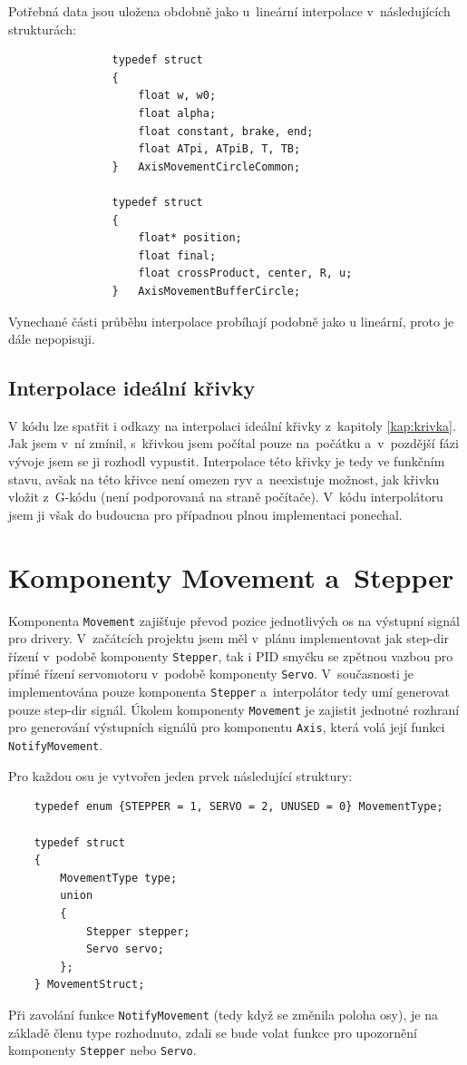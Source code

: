 		Potřebná data jsou uložena obdobně jako u~lineární interpolace v~následujících strukturách:
				\begin{verbatim}
				typedef struct
				{
				    float w, w0;
				    float alpha;
				    float constant, brake, end;
				    float ATpi, ATpiB, T, TB;
				}	AxisMovementCircleCommon;
				
				typedef struct
				{
				    float* position;
				    float final;
				    float crossProduct, center, R, u;
				}	AxisMovementBufferCircle;
				\end{verbatim}
		
		Vynechané části průběhu interpolace probíhají podobně jako u lineární, proto je dále nepopisuji.
		
		\subsection{Interpolace ideální křivky}
		V kódu lze spatřit i odkazy na interpolaci ideální křivky z~kapitoly \ref{kap:krivka}. Jak jsem v~ní zmínil, s~křivkou jsem počítal pouze na~počátku a~v~pozdější fázi vývoje jsem se ji rozhodl vypustit. Interpolace této křivky je tedy ve funkčním stavu, avšak na této křivce není omezen ryv a~neexistuje možnost, jak křivku vložit z~G-kódu (není podporovaná na straně počítače). V~kódu interpolátoru jsem ji však do budoucna pro případnou plnou implementaci ponechal.
		
	\section{Komponenty Movement a~Stepper}
	
	Komponenta {\tt Movement} zajišťuje převod pozice jednotlivých os na výstupní signál pro drivery. V~začátcích projektu jsem měl v~plánu implementovat jak step-dir řízení v~podobě komponenty {\tt Stepper}, tak i PID smyčku se zpětnou vazbou pro přímé řízení servomotoru v~podobě komponenty {\tt Servo}. V~současnosti je implementována pouze komponenta {\tt Stepper} a~interpolátor tedy umí generovat pouze step-dir signál. Úkolem komponenty {\tt Movement} je zajistit jednotné rozhraní pro generování výstupních signálů pro komponentu {\tt Axis}, která volá její funkci {\tt NotifyMovement}.
	
	Pro každou osu je vytvořen jeden prvek následující struktury:
	\begin{verbatim}
	typedef enum {STEPPER = 1, SERVO = 2, UNUSED = 0} MovementType;
	
	typedef struct
	{
	    MovementType type;
	    union
	    {
	        Stepper stepper;
	        Servo servo;
	    };
	} MovementStruct;
	\end{verbatim}
	Při zavolání funkce {\tt NotifyMovement} (tedy když se změnila poloha osy), je na základě členu type rozhodnuto, zdali se bude volat funkce pro upozornění komponenty {\tt Stepper} nebo {\tt Servo}.
	
